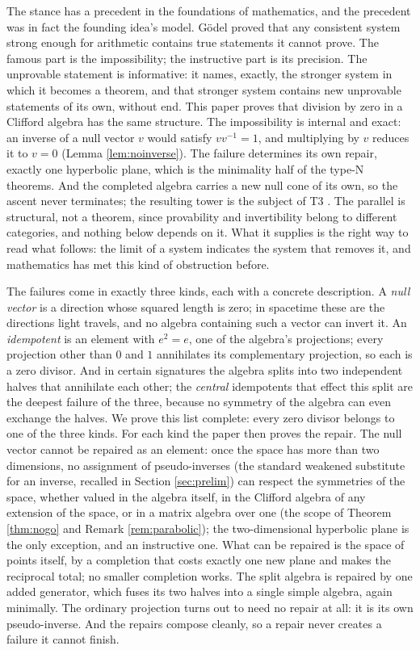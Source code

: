 The stance has a precedent in the foundations of mathematics, and the precedent was in fact the founding idea's model. G\"odel proved that any consistent system strong enough for arithmetic contains true statements it cannot prove. The famous part is the impossibility; the instructive part is its precision. The unprovable statement is informative: it names, exactly, the stronger system in which it becomes a theorem, and that stronger system contains new unprovable statements of its own, without end. This paper proves that division by zero in a Clifford algebra has the same structure. The impossibility is internal and exact: an inverse of a null vector $v$ would satisfy $vv^{-1} = 1$, and multiplying by $v$ reduces it to $v = 0$ (Lemma \ref{lem:noinverse}). The failure determines its own repair, exactly one hyperbolic plane, which is the minimality half of the type-N theorems. And the completed algebra carries a new null cone of its own, so the ascent never terminates; the resulting tower is the subject of T3 \cite{ButlerT3}. The parallel is structural, not a theorem, since provability and invertibility belong to different categories, and nothing below depends on it. What it supplies is the right way to read what follows: the limit of a system indicates the system that removes it, and mathematics has met this kind of obstruction before.

The failures come in exactly three kinds, each with a concrete description. A \emph{null vector} is a direction whose squared length is zero; in spacetime these are the directions light travels, and no algebra containing such a vector can invert it. An \emph{idempotent} is an element with $e^2 = e$, one of the algebra's projections; every projection other than $0$ and $1$ annihilates its complementary projection, so each is a zero divisor. And in certain signatures the algebra splits into two independent halves that annihilate each other; the \emph{central} idempotents that effect this split are the deepest failure of the three, because no symmetry of the algebra can even exchange the halves. We prove this list complete: every zero divisor belongs to one of the three kinds. For each kind the paper then proves the repair. The null vector cannot be repaired as an element: once the space has more than two dimensions, no assignment of pseudo-inverses (the standard weakened substitute for an inverse, recalled in Section \ref{sec:prelim}) can respect the symmetries of the space, whether valued in the algebra itself, in the Clifford algebra of any extension of the space, or in a matrix algebra over one (the scope of Theorem \ref{thm:nogo} and Remark \ref{rem:parabolic}); the two-dimensional hyperbolic plane is the only exception, and an instructive one. What can be repaired is the space of points itself, by a completion that costs exactly one new plane and makes the reciprocal total; no smaller completion works. The split algebra is repaired by one added generator, which fuses its two halves into a single simple algebra, again minimally. The ordinary projection turns out to need no repair at all: it is its own pseudo-inverse. And the repairs compose cleanly, so a repair never creates a failure it cannot finish.

